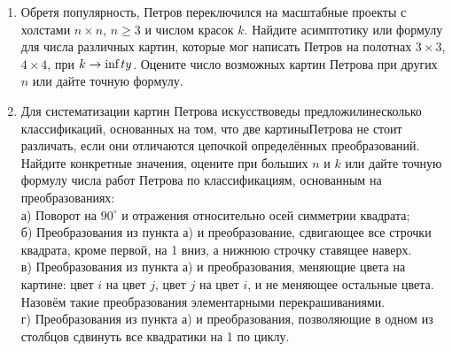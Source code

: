 \begin{enumerate}
\item Обретя популярность, Петров переключился на масштабные проекты с холстами $n\times n$, $n\geq 3$ и числом красок $k$. Найдите асимптотику или формулу для числа различных картин, которые мог написать Петров на полотнах $3\times 3$, $4\times 4$, при $k\to\text{inf\,}ty$. Оцените число возможных картин Петрова при других $n$ или дайте точную формулу.
\item Для систематизации картин Петрова искусствоведы предложили\linebreak несколько классификаций, основанных на том, что две картины\linebreak Петрова не стоит различать, если они отличаются цепочкой определённых преобразований. Найдите конкретные значения, оцените при больших $n$ и $k$ или дайте точную формулу числа работ Петрова по классификациям, основанным на преобразованиях: \\
а) Поворот на $90^{\circ}$ и отражения относительно осей симметрии квадрата;\\
б) Преобразования из пункта а) и преобразование, сдвигающее все строчки квадрата, кроме первой, на 1 вниз, а нижнюю строчку ставящее наверх.\\
в) Преобразования из пункта а) и преобразования, меняющие цвета на картине: цвет $i$ на цвет $j$, цвет $j$ на цвет $i$, и не меняющее остальные цвета. Назовём такие преобразования элементарными перекрашиваниями.\\
г) Преобразования из пункта а) и преобразования, позволяющие в одном из столбцов сдвинуть все квадратики на 1 по циклу. \\
\begin{figure}[h]\label{recolor}
\begin{center}
\end{center}
\end{figure}
\end{enumerate}
